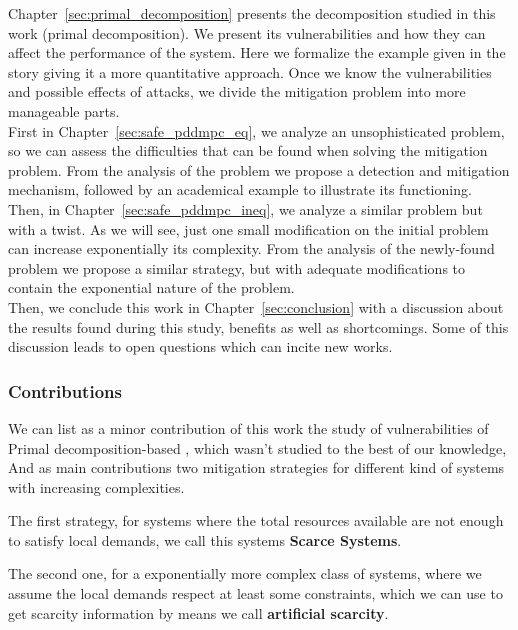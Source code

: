 \documentclass[../main.tex]{subfiles}
\begin{document}
Chapter~\ref{sec:primal_decomposition} presents the decomposition studied in this work (primal decomposition). We present its vulnerabilities and how they can affect the performance of the system. Here we formalize the example given in the story giving it a more quantitative approach.
Once we know the vulnerabilities and possible effects of attacks, we divide the mitigation problem into more manageable parts.
\\ First in Chapter~\ref{sec:safe_pddmpc_eq}, we analyze an unsophisticated problem, so we can assess the difficulties that can be found when solving the mitigation problem. From the analysis of the problem we propose a detection and mitigation mechanism, followed by an academical example to illustrate its functioning.
\\Then, in Chapter~\ref{sec:safe_pddmpc_ineq}, we analyze a similar problem but with a twist. As we will see, just one small modification on the initial problem can increase exponentially its complexity.
From the analysis of the newly-found problem we propose a similar strategy, but with adequate modifications to contain the exponential nature of the problem.
\\Then, we conclude this work in Chapter~\ref{sec:conclusion} with a discussion about the results found during this study, benefits as well as shortcomings. Some of this discussion leads to open questions which can incite new works.

\subsubsection{Contributions}
We can list as a minor contribution of this work the study of vulnerabilities of Primal decomposition-based \dmpc{}, which wasn't studied to the best of our knowledge,
And as main contributions two mitigation strategies for different kind of systems with increasing complexities.

The first strategy, for systems where the total resources available are not enough to satisfy local demands, we call this systems \textbf{Scarce Systems}.

The second one, for a exponentially more complex class of systems, where we assume the local demands respect at least some constraints, which we can use to get scarcity information by means we call \textbf{artificial scarcity}.
\end{document}
